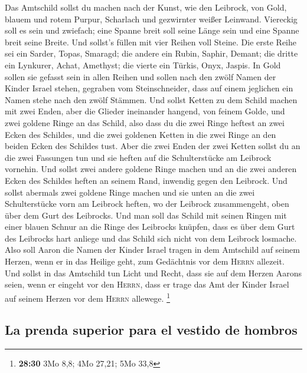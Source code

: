 Das Amtschild sollst du machen nach der Kunst, wie den
Leibrock, von Gold, blauem und rotem Purpur, Scharlach und gezwirnter
weißer Leinwand.  Viereckig soll es sein und zwiefach;
eine Spanne breit soll seine Länge sein und eine Spanne breit seine
Breite.  Und sollst's füllen mit vier Reihen voll Steine.
Die erste Reihe sei ein Sarder, Topas, Smaragd;  die
andere ein Rubin, Saphir, Demant;  die dritte ein
Lynkurer, Achat, Amethyst;  die vierte ein Türkis, Onyx,
Jaspis. In Gold sollen sie gefasst sein in allen Reihen 
und sollen nach den zwölf Namen der Kinder Israel stehen, gegraben vom
Steinschneider, dass auf einem jeglichen ein Namen stehe nach den zwölf
Stämmen.  Und sollst Ketten zu dem Schild machen mit zwei
Enden, aber die Glieder ineinander hangend, von feinem Golde,
 und zwei goldene Ringe an das Schild, also dass du die
zwei Ringe heftest an zwei Ecken des Schildes,  und die
zwei goldenen Ketten in die zwei Ringe an den beiden Ecken des Schildes
tust.  Aber die zwei Enden der zwei Ketten sollst du an
die zwei Fassungen tun und sie heften auf die Schulterstücke am Leibrock
vornehin.  Und sollst zwei andere goldene Ringe machen
und an die zwei anderen Ecken des Schildes heften an seinem Rand,
inwendig gegen den Leibrock.  Und sollst abermals zwei
goldene Ringe machen und sie unten an die zwei Schulterstücke vorn am
Leibrock heften, wo der Leibrock zusammengeht, oben über dem Gurt des
Leibrocks.  Und man soll das Schild mit seinen Ringen mit
einer blauen Schnur an die Ringe des Leibrocks knüpfen, dass es über dem
Gurt des Leibrocks hart anliege und das Schild sich nicht von dem
Leibrock losmache.  Also soll Aaron die Namen der Kinder
Israel tragen in dem Amtschild auf seinem Herzen, wenn er in das Heilige
geht, zum Gedächtnis vor dem \textsc{Herrn} allezeit. 
Und sollst in das Amtschild tun Licht und Recht, dass sie auf dem Herzen
Aarons seien, wenn er eingeht vor den \textsc{Herrn}, dass er trage das
Amt der Kinder Israel auf seinem Herzen vor dem \textsc{Herrn} allewege.
\footnote{\textbf{28:30} 3Mo 8,8; 4Mo 27,21; 5Mo 33,8}

\hypertarget{la-prenda-superior-para-el-vestido-de-hombros}{%
\subsection{La prenda superior para el vestido de
hombros}\label{la-prenda-superior-para-el-vestido-de-hombros}}

